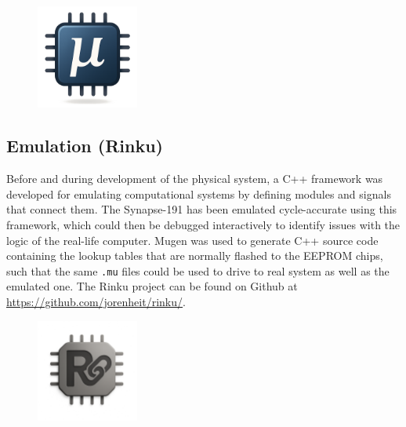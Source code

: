 \begin{figure}[H]
  \centering
  \includegraphics[width=0.3\textwidth]{img/mugen_logo}
\end{figure}

\subsection{Emulation (Rinku)}
Before and during development of the physical system, a C++ framework was developed for emulating computational systems by defining modules and signals that connect them. The Synapse-191 has been emulated cycle-accurate using this framework, which could then be debugged interactively to identify issues with the logic of the real-life computer. Mugen was used to generate C++ source code containing the lookup tables that are normally flashed to the EEPROM chips, such that the same \texttt{.mu} files could be used to drive to real system as well as the emulated one. The Rinku project can be found on Github at \url{https://github.com/jorenheit/rinku/}.

\begin{figure}[H]
  \centering
  \includegraphics[width=0.3\textwidth]{img/rinku_logo}
\end{figure}
